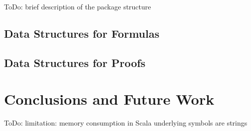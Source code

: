 \documentclass{llncs}
\begin{document}
ToDo: brief description of the package structure


\subsection{Data Structures for Formulas}


\subsection{Data Structures for Proofs}




\section{Conclusions and Future Work}

ToDo: limitation: memory consumption in Scala
underlying symbols are strings





\end{document}
